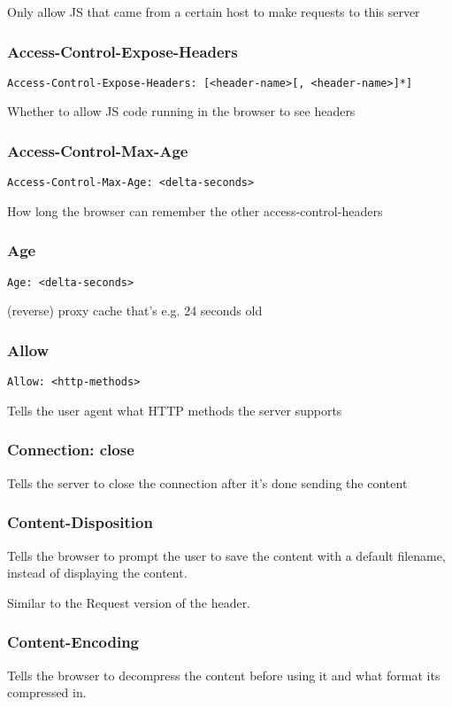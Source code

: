 \documentclass[../CMPUT-404-Notes.tex]{subfiles}
\begin{document}
Only allow JS that came from a certain host to make requests to this server


\subsubsection{Access-Control-Expose-Headers}
\texttt{Access-Control-Expose-Headers: [<header-name>[, <header-name>]*]}

Whether to allow JS code running in the browser to see headers

\subsubsection{Access-Control-Max-Age}
\texttt{Access-Control-Max-Age: <delta-seconds>}

How long the browser can remember the other access-control-headers

\subsubsection{Age}
\texttt{Age: <delta-seconds>}

(reverse) proxy cache that's e.g. 24 seconds old

\subsubsection{Allow}
\texttt{Allow: <http-methods>}

Tells the user agent what HTTP methods the server supports

\subsubsection{Connection: close}
Tells the server to close the connection after it's done sending the content

\subsubsection{Content-Disposition}
Tells the browser to prompt the user to save the content with a default filename, instead of displaying the content.

Similar to the Request version of the header.

\subsubsection{Content-Encoding}
Tells the browser to decompress the content before using it and what format its compressed in. 
\end{document}
